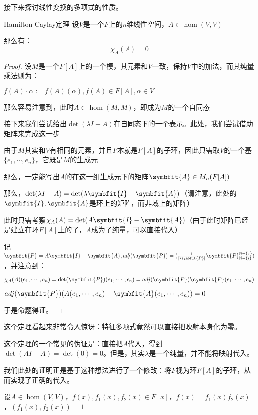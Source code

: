 \documentclass[12pt, a4paper, oneside, UTF8]{ctexbook}
\begin{document}
			接下来探讨线性变换的多项式的性质。
			\begin{para}{0}
					\begin{them}{Hamilton-Caylay定理}{}
						设$V$是一个$F$上的$n$维线性空间，$A \in \hom(V,V)$

						那么有：
						\begin{equation}
							\chi_A(A)=0
						\end{equation}
					\end{them}
					\begin{proof}
						设$M$是一个$F[A]$上的一个模，其元素和$V$一致，保持$V$中的加法，而其纯量乘法则为：

						$f(A)\cdot \alpha := f(A)(\alpha ),f(A) \in F[A],\alpha \in V$

						那么容易注意到，此时$A \in \hom(M,M)$，即成为$M$的一个自同态

						接下来我们尝试给出$\det(\lambda I-A)$在自同态下的一个表示。此处，我们尝试借助矩阵来完成这一步

						由于$M$其实和$V$有相同的元素，并且$F$本就是$F[A]$的子环，因此只需取$V$的一个基$\{e_1,\cdots,e_n\}$，它既是$M$的生成元

						那么，一定能写出$A$的在这一组生成元下的矩阵$\symbfit{A} \in M_n(F[A])$

						那么，$\det(\lambda I-A)=\det(\lambda \symbfit{I}-\symbfit{A})$（请注意，此处的$\symbfit{I},\symbfit{A}$是环上的矩阵，而非域上的矩阵）

						此时只需考察$\chi_A(A)=\det(A\symbfit{I}-\symbfit{A})$（由于此时矩阵已经是建立在环$F[A]$上的了，$A$成为了纯量，可以直接代入）

						记$\symbfit{P}=A\symbfit{I}-\symbfit{A},adj(\symbfit{P})=(\frac{1}{|\symbfit{P}|}\symbfit{P}_{\N-\{i\}}^{\N-\{j\}})$，并注意到：

						$\chi_A(A)(e_1,\cdots,e_n)=\det(\symbfit{P})(e_1,\cdots,e_n)=adj(\symbfit{P})\symbfit{P}(e_1,\cdots,e_n)$

						$adj(\symbfit{P})(A(e_1,\cdots,e_n)-\symbfit{A}(e_1,\cdots,e_n))=0$

						于是命题得证。
					\end{proof}
					这个定理看起来非常令人惊讶：特征多项式竟然可以直接把映射本身化为零。

					这个定理的一个常见的伪证是：直接把$A$代入，得到$\det(AI-A)=\det(0)=0$。但是，其实$\lambda $是一个纯量，并不能将映射代入。

					我们此处的证明正是基于这种想法进行了一个修改：将$F$视为环$F[A]$的子环，从而实现了正确的代入。
				\point{}
					\begin{proposition}
						设$A \in \hom(V,V)$，$f(x),f_1(x),f_2(x) \in F[x]$，$f(x)=f_1(x)f_2(x)$，$(f_1(x),f_2(x))=1$


\end{proposition}
\end{para}
\end{document}
